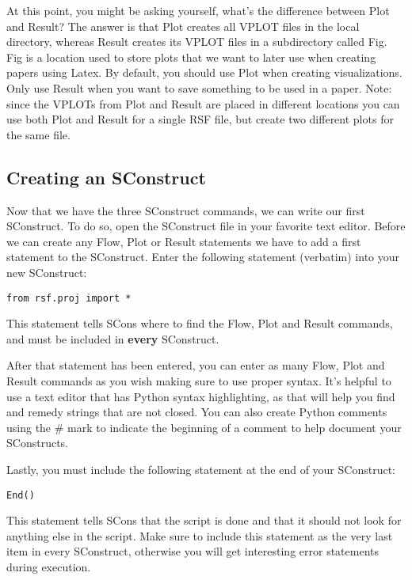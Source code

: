 At this point, you might be asking yourself, what's the difference between Plot and Result?  The answer is that Plot creates all VPLOT files in the local directory, whereas Result creates its VPLOT files in a subdirectory called Fig.  Fig is a location used to store plots that we want to later use when creating papers using Latex.  By default, you should use Plot when creating visualizations.  Only use Result when you want to save something to be used in a paper.  Note: since the VPLOTs from Plot and Result are placed in different locations you can use both Plot and Result for a single RSF file, but create two different plots for the same file.

\subsection{Creating an SConstruct}
Now that we have the three SConstruct commands, we can write our first SConstruct.  To do so, open the SConstruct file in your favorite text editor.  Before we can create any Flow, Plot or Result statements we have to add a first statement to the SConstruct.  Enter the following statement (verbatim) into your new SConstruct:
\begin{verbatim}
from rsf.proj import *
\end{verbatim}
This statement tells SCons where to find the Flow, Plot and Result commands, and must be included in \textbf{every} SConstruct.

After that statement has been entered, you can enter as many Flow, Plot and Result commands as you wish making sure to use proper syntax.  It's helpful to use a text editor that has Python syntax highlighting, as that will help you find and remedy strings that are not closed.  You can also create Python comments using the $\#$ mark to indicate the beginning of a comment to help document your SConstructs.

Lastly, you must include the following statement at the end of your SConstruct:
\begin{verbatim}
End()
\end{verbatim}
This statement tells SCons that the script is done and that it should not look for anything else in the script.  Make sure to include this statement as the very last item in every SConstruct, otherwise you will get interesting error statements during execution.  

